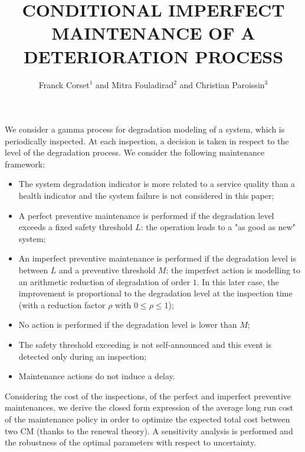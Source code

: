 \documentclass{rps-esrel2021}
\begin{document}
\title{CONDITIONAL IMPERFECT MAINTENANCE OF A DETERIORATION PROCESS}

\author{Franck Corset$^{1}$ and Mitra Fouladirad$^{2}$ and Christian Paroissin$^{3}$}

\address{$^{1}$Univ. Grenoble Alpes, CNRS, Grenoble INP, LJK, 38000 Grenoble, France }

\address{$^{2}$Institut Charles Delaunay – LM2S, UMR 6281, CNRS, Université de Technologie de Troyes, 12 rue Marie Curie, CS 42060, 10004 Troyes, France. }

\address{$^{3}$Université de Pau et des Pays de l'Adour, E2S UPPA, CNRS, LMAP, UMR 5142, 64000 Pau, France. }

\vspace*{18pt}

We consider a gamma process for degradation modeling of a system, which is periodically inspected. At each inspection, a decision is taken in respect to the level of the degradation process. We consider the following maintenance framework:
\begin{itemize}
\item The system degradation indicator is more related to a service quality than a health indicator and the system failure is not considered in this paper;
\item A perfect preventive maintenance is performed if the degradation level exceeds a fixed safety threshold $L$: the operation leads to a "as good as new" system;
\item An imperfect preventive maintenance is performed if the degradation level is between $L$ and a preventive threshold $M$: the imperfect action is modelling to an arithmetic reduction of degradation of order $1$. In this later case, the improvement is proportional to the degradation level at the inspection time (with a reduction factor $\rho$ with $0\leq\rho\leq 1$);
\item No action is performed if the degradation level is lower than $M$;
\item The safety threshold exceeding is not self-announced and this event is detected only during an inspection;
\item Maintenance actions do not induce a delay.
\end{itemize}

Considering the cost of the inspections, of the perfect and imperfect preventive maintenances, we derive the closed form expression of the average long run cost of the maintenance policy in order to optimize the expected total cost between two CM (thanks to the renewal theory). A sensitivity analysis is performed and the robustness of the optimal parameters with respect to uncertainty. 
\end{document}
